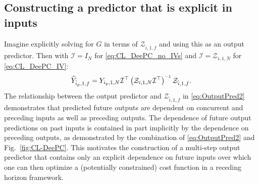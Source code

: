 \subsection{Constructing a predictor that is explicit in inputs}
Imagine explicitly solving for $G$ in terms of $\mathcal{Z}_{\hat{i},1,f}$ and using this as an output predictor. Then with $\mathcal{I}=I_N$ for \eqref{eq:CL_DeePC_no_IVs} and $\mathcal{I}=\mathcal{Z}_{i,1,N}$ for \eqref{eq:CL_DeePC_IV}:
\begin{align}\label{eq:OutputPred2}
     \widehat{Y}_{\hat{i}_p,1,f} = Y_{i_p,1,N}{\mathcal{I}}^\top \left(\mathcal{Z}_{i,1,N}{\mathcal{I}}^\top\right)\inv\mathcal{Z}_{\hat{i},1,f}.
\end{align}
The relationship between the output predictor and $\mathcal{Z}_{\hat{i},1,f}$ in \eqref{eq:OutputPred2} demonstrates that predicted future outputs are dependent on concurrent and preceding inputs as well as preceding outputs. The dependence of future output predictions on past inputs is contained in part implicitly by the dependence on preceding outputs, as demonstrated by the combination of \eqref{eq:OutputPred2} and Fig.~\ref{fig:CL-DeePC}. This motivates the construction of a multi-step output predictor that contains only an explicit dependence on future inputs over which one can then optimize a (potentially constrained) cost function in a receding horizon framework.
